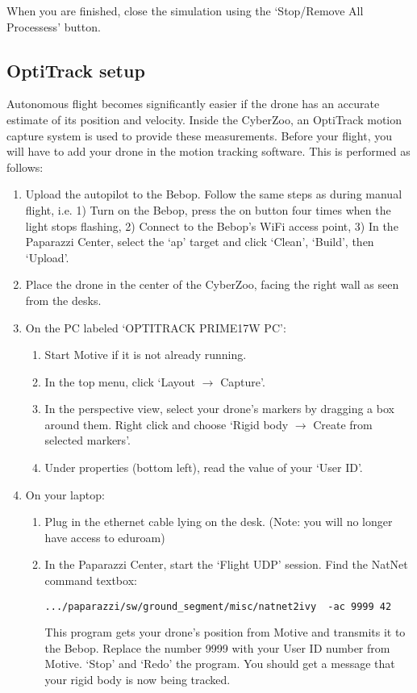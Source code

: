 \documentclass{article}
\begin{document}
\medskip
When you are finished, close the simulation using the `Stop/Remove All Processess' button.


\subsection*{OptiTrack setup}
Autonomous flight becomes significantly easier if the drone has an accurate estimate of its position and velocity. Inside the CyberZoo, an OptiTrack motion capture system is used to provide these measurements. Before your flight, you will have to add your drone in the motion tracking software. This is performed as follows:
\begin{enumerate}
\item Upload the autopilot to the Bebop. Follow the same steps as during manual flight, i.e. 1) Turn on the Bebop, press the on button four times when the light stops flashing, 2) Connect to the Bebop's WiFi access point, 3) In the Paparazzi Center, select the `ap' target and click `Clean', `Build', then `Upload'.
\item Place the drone in the center of the CyberZoo, facing the right wall as seen from the desks.
\item On the PC labeled `OPTITRACK PRIME17W PC':
\begin{enumerate}
\item Start Motive if it is not already running.
\item In the top menu, click `Layout $\rightarrow$ Capture'.
\item In the perspective view, select your drone's markers by dragging a box around them. Right click and choose `Rigid body $\rightarrow$ Create from selected markers'.
\item Under properties (bottom left), read the value of your `User ID'.
\end{enumerate}
\item On your laptop:
\begin{enumerate}
\item Plug in the ethernet cable lying on the desk. (Note: you will no longer have access to eduroam)
\item In the Paparazzi Center, start the `Flight UDP' session. Find the NatNet command textbox:
\begin{verbatim}
.../paparazzi/sw/ground_segment/misc/natnet2ivy  -ac 9999 42
\end{verbatim}
This program gets your drone's position from Motive and transmits it to the Bebop. Replace the number 9999 with your User ID number from Motive. `Stop' and `Redo' the program. You should get a message that your rigid body is now being tracked.\\

\end{enumerate}
\end{enumerate}
\end{document}
